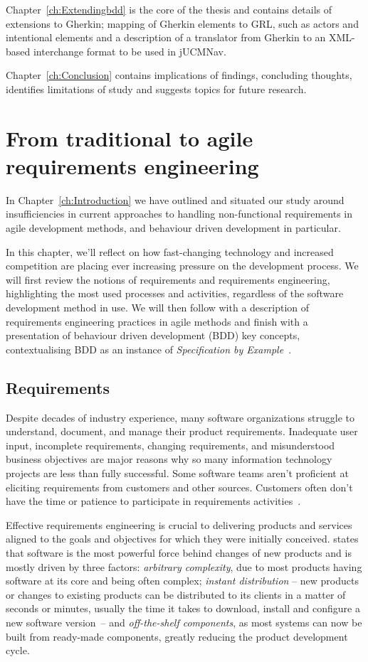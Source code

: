 \documentclass[dissertation,final]{softeng}
\begin{document}
Chapter~\ref{ch:Extendingbdd} is the core of the thesis and contains details of extensions to Gherkin; mapping of Gherkin elements to GRL, such as actors and intentional elements and a description of a translator from Gherkin to an XML-based interchange format to be used in jUCMNav.

Chapter~\ref{ch:Conclusion} contains implications of findings, concluding thoughts, identifies limitations of study and suggests topics for future research.

\chapter{From traditional to agile requirements engineering}
\label{ch:Background}
In Chapter~\ref{ch:Introduction} we have outlined and situated our study around insufficiencies in current approaches to handling non-functional requirements in agile development methods, and behaviour driven development in particular. 

In this chapter, we'll reflect on how fast-changing technology and increased competition are placing ever increasing pressure on the development process. We will first review the notions of requirements and requirements engineering, highlighting the most used processes and activities, regardless of the software development method in use. We will then follow with a description of requirements engineering practices in agile methods and finish with a presentation of behaviour driven development (BDD) key concepts, contextualising BDD as an instance of \emph{Specification by Example}~\citep{Adzic201106}.

\section{Requirements}
\label{sec:requirements}
Despite decades of industry experience, many software organizations struggle to understand, document, and manage their product requirements. Inadequate user input, incomplete requirements, changing requirements, and misunderstood business objectives are major reasons why so many information technology projects are less than fully successful. Some software teams aren't proficient at eliciting requirements from customers and other sources. Customers often don't have the time or patience to participate in requirements activities~\citep{Wiegers2013}. 

Effective requirements engineering is crucial to delivering products and services aligned to the goals and objectives for which they were initially conceived. \citet{Hull2011} states that software is the most powerful force behind changes of new products and is mostly driven by three factors: \emph{arbitrary complexity}, due to most products having software at its core and being often complex; \emph{instant distribution} -- new products or changes to existing products can be distributed to its clients in a matter of seconds or minutes, usually the time it takes to download, install and configure a new software version~-- and \emph{off-the-shelf components}, as most systems can now be built from ready-made components, greatly reducing the product development cycle.
\end{document}

